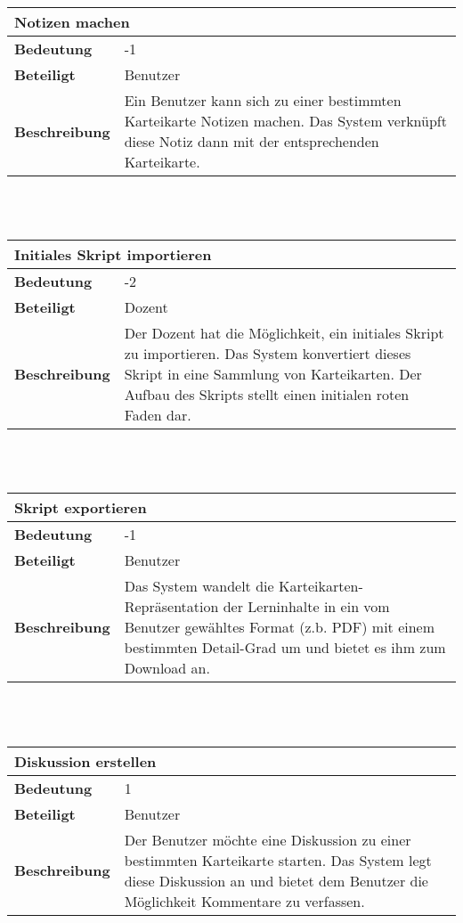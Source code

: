 \documentclass[12pt,a4paper]{article}
\begin{document}
\begin{tabular}{l p{10cm}}
\multicolumn{2}{l}{\textbf{Notizen machen}} \\ \hline
\textbf{Bedeutung} & -1 \\ \hline 
\textbf{Beteiligt} & Benutzer \\ \hline 
\textbf{Beschreibung} & Ein Benutzer kann sich zu einer bestimmten Karteikarte Notizen machen. Das System verknüpft diese Notiz dann mit der entsprechenden Karteikarte. \\ 
\hline 
\end{tabular}\\\\

\begin{tabular}{l p{10cm}}
\multicolumn{2}{l}{\textbf{Initiales Skript importieren}} \\ \hline
\textbf{Bedeutung} & -2 \\ \hline 
\textbf{Beteiligt} & Dozent \\ \hline 
\textbf{Beschreibung} & Der Dozent hat die Möglichkeit, ein initiales Skript zu importieren. Das System konvertiert dieses Skript in eine Sammlung von Karteikarten. Der Aufbau des Skripts stellt einen initialen roten Faden dar. \\ 
\hline 
\end{tabular}\\\\

\begin{tabular}{l p{10cm}}
\multicolumn{2}{l}{\textbf{Skript exportieren}} \\ \hline
\textbf{Bedeutung} & -1 \\ \hline 
\textbf{Beteiligt} & Benutzer \\ \hline 
\textbf{Beschreibung} & Das System wandelt die Karteikarten-Repräsentation der Lerninhalte in ein vom Benutzer gewähltes Format (z.b. PDF) mit einem bestimmten Detail-Grad um und bietet es ihm zum Download an. \\ 
\hline 
\end{tabular}\\\\

\begin{tabular}{l p{10cm}}
\multicolumn{2}{l}{\textbf{Diskussion erstellen}} \\ \hline
\textbf{Bedeutung} & 1 \\ \hline 
\textbf{Beteiligt} & Benutzer \\ \hline 
\textbf{Beschreibung} & Der Benutzer möchte eine Diskussion zu einer bestimmten Karteikarte starten. Das System legt diese Diskussion an und bietet dem Benutzer die Möglichkeit Kommentare zu verfassen. \\ 
\hline 
\end{tabular}\\\\
\end{document}
